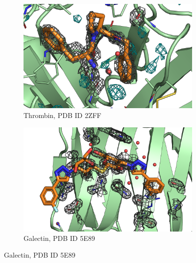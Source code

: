 \documentclass[9pt,bestpractices]{livecoms}
\begin{document}
\begin{figure}
    \begin{subfigure}[b]{0.48\textwidth}
        \centering
        \includegraphics[width=\textwidth]{figures/crystal/pic_2zff.png}
        \caption{Thrombin, PDB ID 2ZFF}
        \label{fig:2zff}
    \end{subfigure}
    \hfill
    \begin{subfigure}[b]{0.48\textwidth}
        \centering
        \includegraphics[width=\textwidth]{figures/crystal/pic_5e89.png}
        \caption{Galectin, PDB ID 5E89}
        \label{fig:5e89}
    \end{subfigure}      
    

\end{figure}
\end{document}
